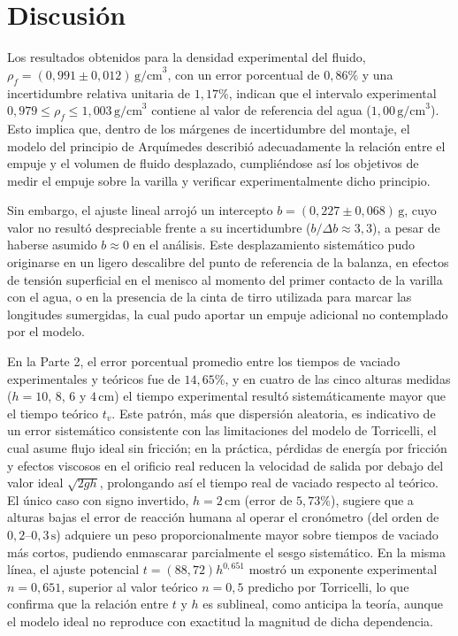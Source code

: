 \section{Discusión}

Los resultados obtenidos para la densidad experimental del fluido,
$\rho_f = (0{,}991 \pm 0{,}012)\,\text{g/cm}^3$, con un error porcentual
de $0{,}86\%$ y una incertidumbre relativa unitaria de $1{,}17\%$,
indican que el intervalo experimental
$0{,}979 \leq \rho_f \leq 1{,}003\,\text{g/cm}^3$ contiene al valor de
referencia del agua ($1{,}00\,\text{g/cm}^3$). Esto implica que, dentro
de los márgenes de incertidumbre del montaje, el modelo del principio
de Arquímedes describió adecuadamente la relación entre el empuje y el
volumen de fluido desplazado, cumpliéndose así los objetivos de medir
el empuje sobre la varilla y verificar experimentalmente dicho
principio.

Sin embargo, el ajuste lineal arrojó un intercepto
$b = (0{,}227 \pm 0{,}068)\,\text{g}$, cuyo valor no resultó
despreciable frente a su incertidumbre ($b/\Delta b \approx 3{,}3$), a
pesar de haberse asumido $b \approx 0$ en el análisis. Este
desplazamiento sistemático pudo originarse en un ligero descalibre del
punto de referencia de la balanza, en efectos de tensión superficial
en el menisco al momento del primer contacto de la varilla con el
agua, o en la presencia de la cinta de tirro utilizada para marcar las
longitudes sumergidas, la cual pudo aportar un empuje adicional no
contemplado por el modelo.

En la Parte 2, el error porcentual promedio entre los tiempos de
vaciado experimentales y teóricos fue de $14{,}65\%$, y en cuatro de
las cinco alturas medidas ($h = 10$, $8$, $6$ y $4\,\text{cm}$) el
tiempo experimental resultó sistemáticamente mayor que el tiempo
teórico $t_v$. Este patrón, más que dispersión aleatoria, es
indicativo de un error sistemático consistente con las limitaciones
del modelo de Torricelli, el cual asume flujo ideal sin fricción; en
la práctica, pérdidas de energía por fricción y efectos viscosos en el
orificio real reducen la velocidad de salida por debajo del valor
ideal $\sqrt{2gh}$, prolongando así el tiempo real de vaciado respecto
al teórico. El único caso con signo invertido, $h = 2\,\text{cm}$
(error de $5{,}73\%$), sugiere que a alturas bajas el error de
reacción humana al operar el cronómetro (del orden de
$0{,}2$--$0{,}3\,\text{s}$) adquiere un peso proporcionalmente mayor
sobre tiempos de vaciado más cortos, pudiendo enmascarar parcialmente
el sesgo sistemático. En la misma línea, el ajuste potencial
$t = (88{,}72)h^{0{,}651}$ mostró un exponente experimental
$n = 0{,}651$, superior al valor teórico $n = 0{,}5$ predicho por
Torricelli, lo que confirma que la relación entre $t$ y $h$ es
sublineal, como anticipa la teoría, aunque el modelo ideal no
reproduce con exactitud la magnitud de dicha dependencia.

